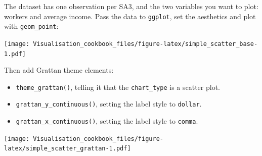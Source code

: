 \documentclass[]{book}
\newenvironment{Shaded}{\begin{snugshade}}{\end{snugshade}}
\newcommand{\DataTypeTok}[1]{\textcolor[rgb]{0.13,0.29,0.53}{#1}}
\newcommand{\KeywordTok}[1]{\textcolor[rgb]{0.13,0.29,0.53}{\textbf{#1}}}
\newcommand{\NormalTok}[1]{#1}
\newcommand{\OperatorTok}[1]{\textcolor[rgb]{0.81,0.36,0.00}{\textbf{#1}}}
\newcommand{\StringTok}[1]{\textcolor[rgb]{0.31,0.60,0.02}{#1}}
\providecommand{\tightlist}{%
  \setlength{\itemsep}{0pt}\setlength{\parskip}{0pt}}
\begin{document}
The dataset has one observation per SA3, and the two variables you want to plot: workers and average income. Pass the data to \texttt{ggplot}, set the aesthetics and plot with \texttt{geom\_point}:

\begin{Shaded}
\end{Shaded}

\texttt{[image: Visualisation\_cookbook\_files/figure-latex/simple\_scatter\_base-1.pdf]}

Then add Grattan theme elements:

\begin{itemize}
\tightlist
\item
  \texttt{theme\_grattan()}, telling it that the \texttt{chart\_type} is a scatter plot.
\item
  \texttt{grattan\_y\_continuous()}, setting the label style to \texttt{dollar}.
\item
  \texttt{grattan\_x\_continuous()}, setting the label style to \texttt{comma}.
\end{itemize}

\begin{Shaded}
\end{Shaded}

\texttt{[image: Visualisation\_cookbook\_files/figure-latex/simple\_scatter\_grattan-1.pdf]}
\end{document}
